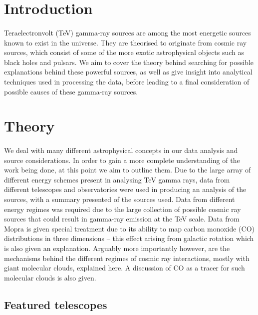 \documentclass[a4paper, titlepage, oneside]{article}
\begin{document}
\begin{multicols}{2}
\section{Introduction}
\paragraph{}
Teraelectronvolt (TeV) gamma-ray sources are among the most energetic sources known to exist in the universe. They are theorised to originate from cosmic ray sources, which consist of some of the more exotic astrophysical objects such as black holes and pulsars. We aim to cover the theory behind searching for possible explanations behind these powerful sources, as well as give insight into analytical techniques used in processing the data, before leading to a final consideration of possible causes of these gamma-ray sources.

\section{Theory}
\paragraph{}
We deal with many different astrophysical concepts in our data analysis and source considerations. In order to gain a more complete understanding of the work being done, at this point we aim to outline them. Due to the large array of different energy schemes present in analysing TeV gamma rays, data from different telescopes and observatories were used in producing an analysis of the sources, with a summary presented of the sources used. Data from different energy regimes was required due to the large collection of possible cosmic ray sources that could result in gamma-ray emission at the TeV scale. Data from Mopra is given special treatment due to its ability to map carbon monoxide (CO) distributions in three dimensions -- this effect arising from galactic rotation which is also given an explanation. Arguably more importantly however, are the mechanisms behind the different regimes of cosmic ray interactions, mostly with giant molecular clouds, explained here. A discussion of CO as a tracer for such molecular clouds is also given.

\subsection{Featured telescopes}

\end{multicols}
\end{document}
